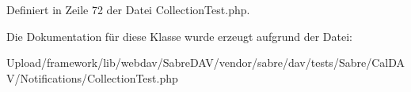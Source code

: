 Definiert in Zeile 72 der Datei Collection\+Test.\+php.



Die Dokumentation für diese Klasse wurde erzeugt aufgrund der Datei\+:\begin{DoxyCompactItemize}
\item 
Upload/framework/lib/webdav/\+Sabre\+D\+A\+V/vendor/sabre/dav/tests/\+Sabre/\+Cal\+D\+A\+V/\+Notifications/Collection\+Test.\+php\end{DoxyCompactItemize}
